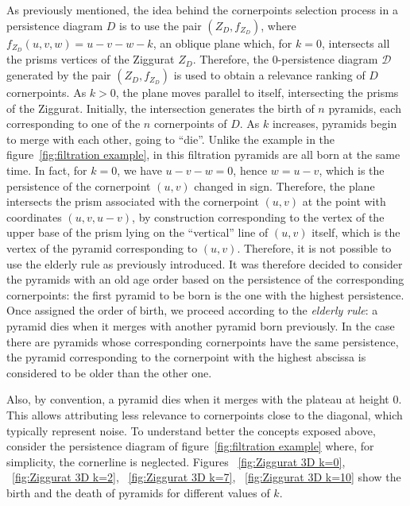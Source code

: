\documentclass[english, LaM, oneside, noexaminfo]{sapthesis}
\begin{document}
As previously mentioned, the idea behind the cornerpoints selection process in a persistence diagram $D$ is to use the pair $(Z_ {D}, f_ {Z_D})$, where $f_ {Z_D}(u, v, w) = u - v - w - k $, an oblique plane which, for $k = 0$, intersects all the prisms vertices of the Ziggurat $Z_D$. Therefore, the $0$-persistence diagram $\mathcal{D}$ generated by the pair $(Z_D, f_{Z_D})$ is used to obtain a relevance ranking of $D$ cornerpoints. As $k>0$, the plane moves parallel to itself, intersecting the prisms of the Ziggurat. Initially, the intersection generates the birth of $n$ pyramids, each corresponding to one of the $n$ cornerpoints of $D$. As $k$ increases, pyramids begin to merge with each other, going to ``die''. Unlike the example in the figure~\ref{fig:filtration example}, in this filtration pyramids are all born at the same time. In fact, for $k = 0$, we have $ u - v - w = 0 $, hence $ w = u-v $, which is the persistence of the cornerpoint $(u, v)$ changed in sign. Therefore, the plane intersects the prism associated with the cornerpoint $(u, v)$ at the point with coordinates $(u, v, u-v)$, by construction corresponding to the vertex of the upper base of the prism lying on the ``vertical'' line of $(u, v)$ itself, which is the vertex of the pyramid corresponding to $(u, v)$. Therefore, it is not possible to use the elderly rule as previously introduced. It was therefore decided to consider the pyramids with an old age order based on the persistence of the corresponding cornerpoints: the first pyramid to be born is the one with the highest persistence. Once assigned
the order of birth, we proceed according to the \textit{elderly rule}: a pyramid dies when it merges with another pyramid born previously. In the case there are pyramids whose corresponding cornerpoints have the same persistence, the pyramid corresponding to the cornerpoint with the highest abscissa is considered to be older than the other one.

\noindent Also, by convention, a pyramid dies when it merges with
the plateau at height $0$. This allows attributing less relevance to cornerpoints close to the diagonal, which typically represent noise. To understand better the concepts exposed above, consider the persistence diagram of figure~\ref{fig:filtration example} where, for simplicity, the cornerline is neglected. Figures ~\ref{fig:Ziggurat 3D k=0}, ~\ref{fig:Ziggurat 3D k=2}, ~\ref{fig:Ziggurat 3D k=7}, ~\ref{fig:Ziggurat 3D k=10} show the birth and the death of pyramids for different values of $k$.
\end{document}
